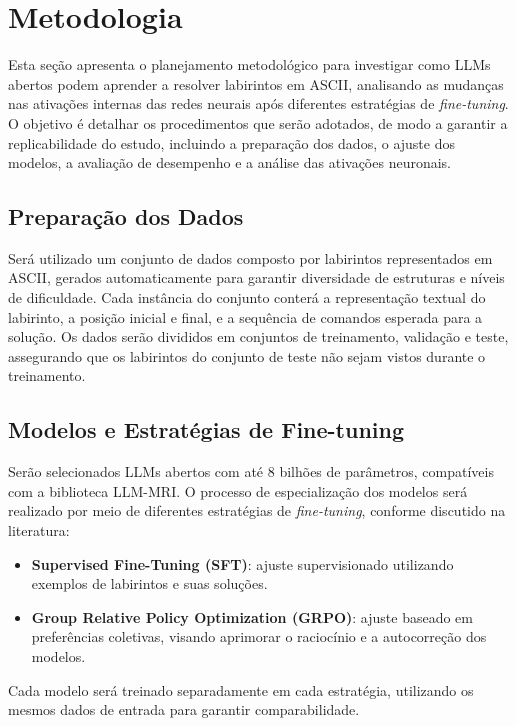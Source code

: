 \section{Metodologia}

Esta seção apresenta o planejamento metodológico para investigar como LLMs abertos podem aprender a resolver labirintos em ASCII, analisando as mudanças nas ativações internas das redes neurais após diferentes estratégias de \textit{fine-tuning}. O objetivo é detalhar os procedimentos que serão adotados, de modo a garantir a replicabilidade do estudo, incluindo a preparação dos dados, o ajuste dos modelos, a avaliação de desempenho e a análise das ativações neuronais.

\subsection{Preparação dos Dados}

Será utilizado um conjunto de dados composto por labirintos representados em ASCII, gerados automaticamente para garantir diversidade de estruturas e níveis de dificuldade. Cada instância do conjunto conterá a representação textual do labirinto, a posição inicial e final, e a sequência de comandos esperada para a solução. Os dados serão divididos em conjuntos de treinamento, validação e teste, assegurando que os labirintos do conjunto de teste não sejam vistos durante o treinamento.

\subsection{Modelos e Estratégias de Fine-tuning}

Serão selecionados LLMs abertos com até 8 bilhões de parâmetros, compatíveis com a biblioteca LLM-MRI. O processo de especialização dos modelos será realizado por meio de diferentes estratégias de \textit{fine-tuning}, conforme discutido na literatura:
\begin{itemize}
    \item \textbf{Supervised Fine-Tuning (SFT)}: ajuste supervisionado utilizando exemplos de labirintos e suas soluções.
    \item \textbf{Group Relative Policy Optimization (GRPO)}: ajuste baseado em preferências coletivas, visando aprimorar o raciocínio e a autocorreção dos modelos.
\end{itemize}
Cada modelo será treinado separadamente em cada estratégia, utilizando os mesmos dados de entrada para garantir comparabilidade.

